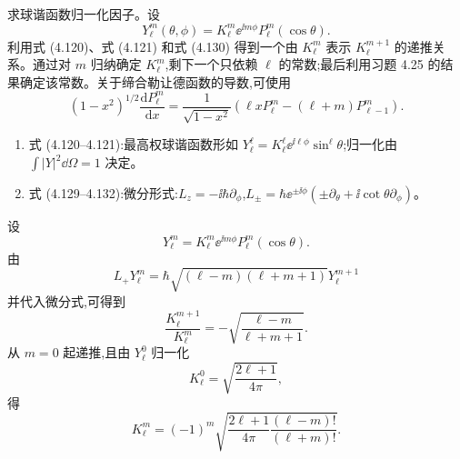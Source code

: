 \begin{question}
求球谐函数归一化因子。设
\[
Y_\ell^m(\theta,\phi)=K_\ell^m \ee^{\ii m\phi}P_\ell^m(\cos\theta).
\]
利用式 (4.120)、式 (4.121) 和式 (4.130) 得到一个由 $K_\ell^m$ 表示 $K_\ell^{m+1}$ 的递推关系。通过对 $m$ 归纳确定 $K_\ell^m$,剩下一个只依赖 $\ell$ 的常数;最后利用习题 4.25 的结果确定该常数。关于缔合勒让德函数的导数,可使用
\[
(1-x^2)^{1/2}\frac{\mathrm dP_\ell^m}{\mathrm dx}=\frac{1}{\sqrt{1-x^2}}\left(\ell xP_\ell^m-(\ell+m)P_{\ell-1}^m\right).
\]

\par\smallskip
{}
\begin{enumerate}[leftmargin=2.2em,itemsep=0.12em,topsep=0.12em,parsep=0pt]
\item 式 (4.120--4.121):最高权球谐函数形如 $Y_\ell^\ell=K_\ell^\ell \ee^{\ii\ell\phi}\sin^\ell\theta$;归一化由 $\int|Y|^2\dd\Omega=1$ 决定。
\item 式 (4.129--4.132):微分形式:$L_z=-\ii\hbar\partial_\phi$,$L_\pm=\hbar \ee^{\pm\ii\phi}(\pm\partial_\theta+\ii\cot\theta\partial_\phi)$。
\end{enumerate}

\end{question}
\begin{solution}

设
\[
Y_\ell^m=K_\ell^m \ee^{\ii m\phi}P_\ell^m(\cos\theta).
\]
由
\[
L_+Y_\ell^m=\hbar\sqrt{(\ell-m)(\ell+m+1)}Y_\ell^{m+1}
\]
并代入微分式,可得到
\[
\frac{K_\ell^{m+1}}{K_\ell^m}=-\sqrt{\frac{\ell-m}{\ell+m+1}}.
\]
从 $m=0$ 起递推,且由 $Y_\ell^0$ 归一化
\[
K_\ell^0=\sqrt{\frac{2\ell+1}{4\pi}},
\]
得
\[
K_\ell^m=(-1)^m\sqrt{\frac{2\ell+1}{4\pi}\frac{(\ell-m)!}{(\ell+m)!}}.
\]

\end{solution}

